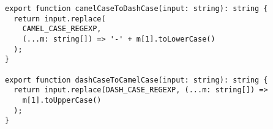 \begin{verbatim}
export function camelCaseToDashCase(input: string): string {
  return input.replace(
    CAMEL_CASE_REGEXP,
    (...m: string[]) => '-' + m[1].toLowerCase()
  );
}

export function dashCaseToCamelCase(input: string): string {
  return input.replace(DASH_CASE_REGEXP, (...m: string[]) =>
    m[1].toUpperCase()
  );
}
\end{verbatim}
